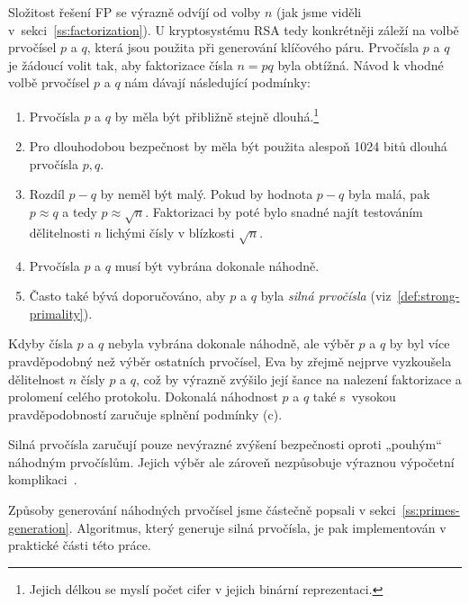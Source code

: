 \documentclass[
  program=infoi,
  biblatex=false,
  figures=true,
  glossaries,
  tables=false,
  sourcecodes=true,
  index
]{kidiplom}
\begin{document}
        Složitost řešení FP se výrazně odvíjí od volby $n$ (jak jsme viděli v~sekci~\ref{ss:factorization}).
        U kryptosystému RSA tedy konkrétněji záleží na volbě prvočísel $p$ a $q$, která jsou použita
        při generování klíčového páru.
        Prvočísla $p$ a $q$ je žádoucí volit tak, aby faktorizace čísla $n =pq$ byla obtížná.
        Návod k vhodné volbě prvočísel $p$ a $q$ nám dávají následující podmínky:

        \begin{enumerate}[label=(\alph*)]
            \item 
                Prvočísla $p$ a $q$ by měla být přibližně stejně dlouhá.\footnote{Jejich délkou se myslí počet cifer v jejich
                binární reprezentaci.}
            \item
                Pro dlouhodobou bezpečnost by měla být použita alespoň 1024 bitů dlouhá prvočísla $p,q$.
            \item 
                Rozdíl $p-q$ by neměl být malý. Pokud by hodnota $p-q$ byla malá, pak $p \approx q$ a tedy
                $p \approx \sqrt{n}$. Faktorizaci by poté bylo snadné najít testováním dělitelnosti $n$ lichými 
                čísly v blízkosti $\sqrt{n}$.
            \item
                Prvočísla $p$ a $q$ musí být vybrána dokonale náhodně.
            \item 
                Často také bývá doporučováno, aby $p$ a $q$ byla \emph{silná prvočísla} (viz~\ref{def:strong-primality}).
        \end{enumerate}

        Kdyby čísla $p$ a $q$ nebyla vybrána dokonale náhodně, ale výběr $p$ a $q$ by byl více
        pravděpodobný než výběr ostatních prvočísel, Eva by zřejmě nejprve vyzkoušela dělitelnost
        $n$ čísly $p$ a $q$, což by výrazně zvýšilo její šance na nalezení faktorizace a prolomení celého protokolu.
        Dokonalá náhodnost $p$ a $q$ také s~vysokou pravděpodobností zaručuje splnění podmínky (c).

        \begin{remark}
            Silná prvočísla zaručují pouze nevýrazné zvýšení bezpečnosti oproti „pouhým“ náhodným prvočíslům.
            Jejich výběr ale zároveň nezpůsobuje výraznou výpočetní komplikaci~\cite{handbook}.
        \end{remark}

        Způsoby generování náhodných prvočísel jsme částečně popsali v sekci~\ref{ss:primes-generation}.
        Algoritmus, který generuje silná prvočísla, je pak implementován v praktické části této práce.
\end{document}
